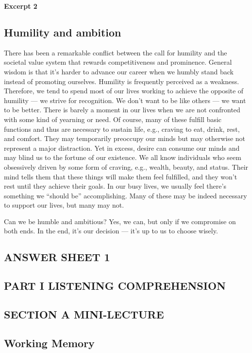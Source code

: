 \documentclass[UTF8,11pt]{ctexart}
\begin{document}
\textbf{Excerpt 2}


\subsection*{\textbf{Humility and ambition}}


There has been a remarkable conflict between the call for humility and the societal value system that rewards competitiveness and prominence. General wisdom is that it’s harder to advance our career when we humbly stand back instead of promoting ourselves. Humility is frequently perceived as a weakness. Therefore, we tend to spend most of our lives working to achieve the opposite of humility — we strive for recognition. We don’t want to be like others — we want to be better. There is barely a moment in our lives when we are not confronted with some kind of yearning or need. Of course, many of these fulfill basic functions and thus are necessary to sustain life, e.g., craving to eat, drink, rest, and comfort. They may temporarily preoccupy our minds but may otherwise not represent a major distraction. Yet in excess, desire can consume our minds and may blind us to the fortune of our existence. We all know individuals who seem obsessively driven by some form of craving, e.g., wealth, beauty, and status. Their mind tells them that these things will make them feel fulfilled, and they won’t rest until they achieve their goals. In our busy lives, we usually feel there’s something we “should be” accomplishing. Many of these may be indeed necessary to support our lives, but many may not.


Can we be humble and ambitious? Yes, we can, but only if we compromise on both ends. In the end, it’s our decision — it’s up to us to choose wisely.


\subsection*{\textbf{ANSWER SHEET 1}}


\subsection*{\textbf{PART I LISTENING COMPREHENSION}}


\subsection*{\textbf{SECTION A MINI-LECTURE}}


\subsection*{\textbf{Working Memory}}
\end{document}
